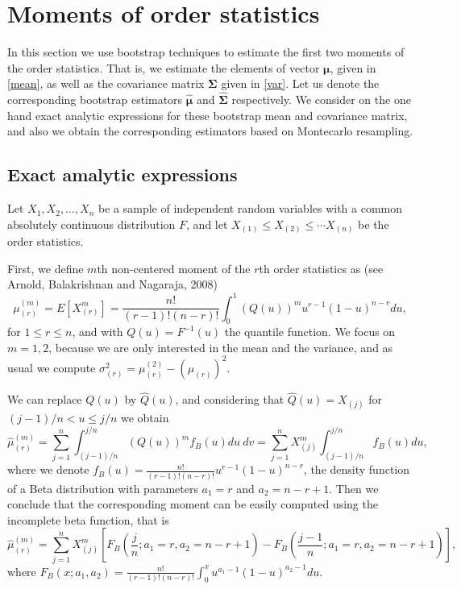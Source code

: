 \documentclass[preprint,12pt]{elsarticle}
\begin{document}
\bigskip
\section{Moments of order statistics}
\noindent In this section we use bootstrap techniques to estimate the first two moments of the order statistics. That is, we estimate the elements of vector $\boldsymbol{\mu}$, given in \eqref{mean}, as well as the covariance matrix $\boldsymbol{\Sigma}$ given in \eqref{var}. Let us denote the corresponding bootstrap estimators $\widehat{\boldsymbol{\mu}}$ and $\widehat{\boldsymbol{\Sigma}}$ respectively.  We consider on the one hand exact analytic expressions for these bootstrap mean and covariance matrix, and also we obtain the corresponding estimators based on Montecarlo resampling. 

\subsection{Exact amalytic expressions}
\noindent Let $X_1,X_2,\ldots, X_n$ be a sample of independent random variables with a common absolutely continuous distribution $F$, and let  $X_{(1)} \leq X_{(2)}\leq \cdots X_{(n)}$ be the order statistics. 

First, we define $m$th non-centered moment of the $r$th order statistics as (see Arnold, Balakrishnan and Nagaraja, 2008)
\begin{equation}\label{mu.r}
\mu_{(r)}^{(m)}=E\left[X_{(r)}^m\right]=\frac{n!}{(r-1)!(n-r)!}\int_0^1(Q(u))^m u^{r-1}(1-u)^{n-r}du,
\end{equation}
for $1\leq r \leq n$, and with $Q(u)=F^{-1}(u)$ the quantile function. We focus on $m=1,2$, because we are only interested in the mean and the variance, and as usual we compute $\sigma_{(r)}^2=\mu_{(r)}^{(2)}-\left(\mu_{(r)}\right)^2$.  
\vskip 0.5cm

We can replace $ Q(u)$ by $\widehat{Q}(u)$, and considering that $\widehat{Q}(u)= X_{(j)}$ for $(j-1)/n < u \leq j/n$ we obtain
\begin{equation}\label{mu.hat}
\widehat{\mu}_{(r)}^{(m)}=\sum_{j=1}^n\int_{(j-1)/n}^{j/n}(Q(u))^m f_B(u)du \ dv=\sum_{j=1}^n X_{(j)}^m\int_{(j-1)/n}^{j/n} f_B(u)du,
\end{equation}
where we denote $f_B(u)=\frac{n!}{(r-1)!(n-r)!} u^{r-1}(1-u)^{n-r}$, the density function of a Beta distribution with parameters $a_1=r$ and $a_2=n-r+1$. Then we conclude that the corresponding moment can be easily computed using the incomplete beta function, that is
\begin{equation}\label{mu.hat}
\widehat{\mu}_{(r)}^{(m)}=\sum_{j=1}^n X_{(j)}^m\left[F_B(\frac{j}{n};a_1=r,a_2=n-r+1)-F_B(\frac{j-1}{n};a_1=r,a_2=n-r+1)\right],
\end{equation}
where $F_B(x;a_1,a_2)=\frac{n!}{(r-1)!(n-r)!}\int_0^x u^{a_1-1}(1-u)^{a_2-1} du$.
\bigskip
\end{document}
